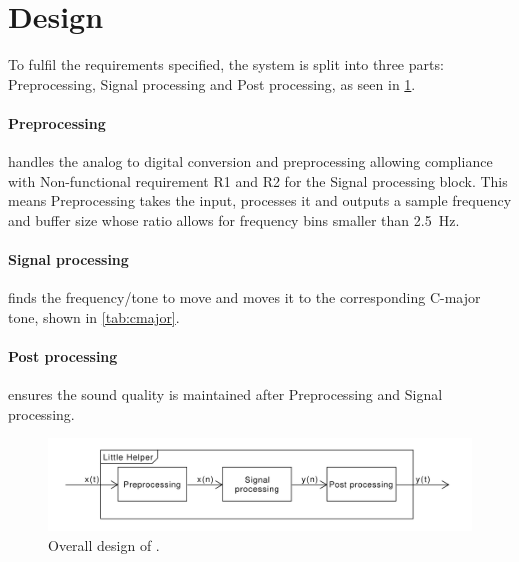 
\section{Design}
\label{ch:Design}

To fulfil the requirements specified, the system is split into three parts: Preprocessing, Signal processing and Post processing, as seen in \cref{fig:overalldesign}.

\paragraph{Preprocessing} handles the analog to digital conversion and preprocessing allowing compliance with Non-functional requirement R1 and R2 for the Signal processing block.
This means Preprocessing takes the input, processes it and outputs a sample frequency and buffer size whose ratio allows for frequency bins smaller than \SI{2.5}{\hertz}.

\paragraph{Signal processing} finds the frequency/tone to move and moves it to the corresponding C-major tone, shown in \cref{tab:cmajor}.

\paragraph{Post processing} ensures the sound quality is maintained after Preprocessing and Signal processing.

\begin{figure}
	\centering
	\includegraphics[width=1\linewidth]{gfx/Design/OverallDesign.pdf}
	\caption{Overall design of \systemName.}
	\label{fig:overalldesign}
\end{figure}


\FloatBarrier